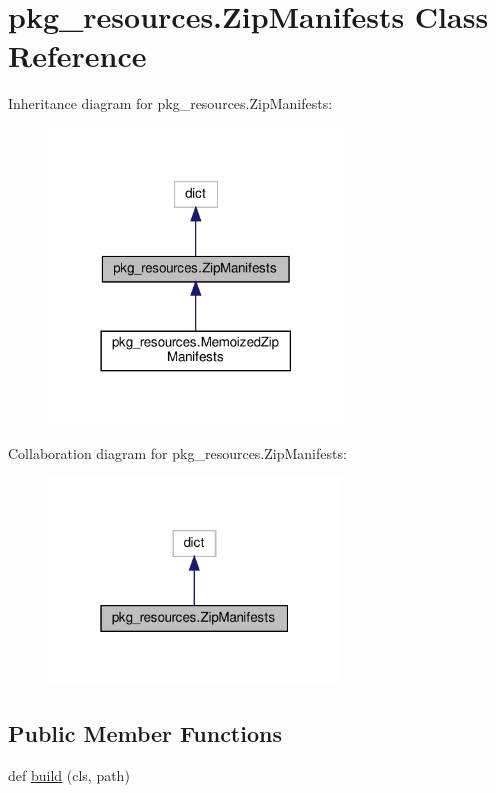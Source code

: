 \hypertarget{classpkg__resources_1_1ZipManifests}{}\section{pkg\+\_\+resources.\+Zip\+Manifests Class Reference}
\label{classpkg__resources_1_1ZipManifests}


Inheritance diagram for pkg\+\_\+resources.\+Zip\+Manifests\+:
\nopagebreak
\begin{figure}[H]
\begin{center}
\leavevmode
\includegraphics[width=222pt]{classpkg__resources_1_1ZipManifests__inherit__graph}
\end{center}
\end{figure}


Collaboration diagram for pkg\+\_\+resources.\+Zip\+Manifests\+:
\nopagebreak
\begin{figure}[H]
\begin{center}
\leavevmode
\includegraphics[width=220pt]{classpkg__resources_1_1ZipManifests__coll__graph}
\end{center}
\end{figure}
\subsection*{Public Member Functions}
\begin{DoxyCompactItemize}
\item 
def \hyperlink{classpkg__resources_1_1ZipManifests_abe93fa68a3c85fc254dc117af87a0703}{build} (cls, path)
\end{DoxyCompactItemize}
